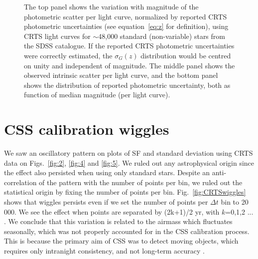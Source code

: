 \documentclass[fleqn,usenatbib]{mnras}
\begin{document}
\begin{figure}
\caption{The top panel shows the variation with magnitude of the photometric
scatter per light curve, normalized by reported CRTS photometric uncertainties 
(see equation~\ref{eq:z} for definition), using CRTS light curves for $\sim$48,000 standard 
(non-variable) stars from the SDSS catalogue. If the reported CRTS photometric uncertainties
were correctly estimated, the $\sigma_G(z)$ distribution would be centred on unity and 
independent of magnitude. The middle panel shows the observed intrinsic 
scatter per light curve, and the bottom panel shows the distribution of reported photometric 
uncertainty, both as function of median magnitude (per light curve). 
\label{fig:CRTSerrors}} 
\end{figure}


\section{CSS calibration wiggles} 
\label{sec:wiggles}

We saw  an oscillatory pattern on plots of SF and standard deviation using CRTS data on Figs.~\ref{fig:2}, \ref{fig:4} and \ref{fig:5}. We ruled out any astrophysical origin since the effect also persisted when using only standard stars. Despite an anti-correlation of the pattern with the number of points per bin, we ruled out the statistical origin by fixing the number of points per bin.  Fig.~\ref{fig:CRTSwiggles} shows that wiggles persists even if we set the number of points per $\Delta t$  bin to 20$\,$000. We see the effect when points are separated by (2k+1)/2 yr, with $k$=0,1,2 ... . We conclude that this variation is related to the airmass which fluctuates seasonally, which was  not properly accounted for in the CSS calibration process. This is because the primary aim of CSS was to detect moving objects, which  requires only intranight consistency, and not long-term accuracy \citep{drake2013}.
\end{document}
